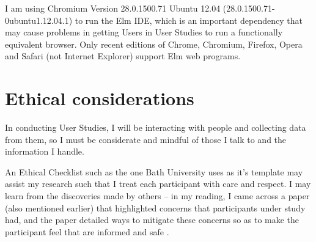 \documentclass[11pt,openright,a4paper]{report}
\begin{document}
I am using Chromium Version 28.0.1500.71 Ubuntu 12.04
(28.0.1500.71-0ubuntu1.12.04.1) to run the Elm IDE, which is an important
dependency that may cause problems in getting Users in User Studies to run a
functionally equivalent browser. Only recent editions of Chrome, Chromium,
Firefox, Opera and Safari (not Internet Explorer) support Elm web programs.

\chapter{Ethical considerations}

In conducting User Studies, I will be interacting with people and collecting
data from them, so I must be considerate and mindful of those I talk to and the
information I handle.

An Ethical Checklist such as the one Bath University uses as it's template
\cite{Bath2013a} may assist my research such that I treat each participant
with care and respect. I may learn from the discoveries made by others -- in my
reading, I came across a paper (also mentioned earlier) that highlighted concerns that
participants under study had, and the paper detailed ways to mitigate these
concerns so as to make the participant feel that are informed and safe
\cite{Yates2012a}.



\printglossary
{}
\end{document}
